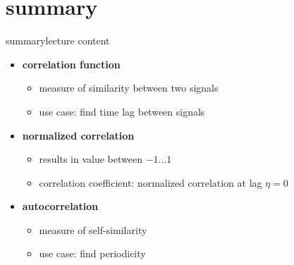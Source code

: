     \section{summary}
        \begin{frame}{summary}{lecture content}
            \begin{itemize}
                \item   \textbf{correlation function}
                    \begin{itemize}
                        \item   measure of similarity between two signals
                        \item   use case: find time lag between signals
                    \end{itemize}
                \bigskip
                \item   \textbf{normalized correlation}
                    \begin{itemize}
                        \item   results in value between $-1\ldots 1$
                        \item   correlation coefficient: normalized correlation at lag $\eta=0$
                    \end{itemize}
                \bigskip
                \item   \textbf{autocorrelation}
                    \begin{itemize}
                        \item   measure of self-similarity
                        \item   use case: find periodicity
                    \end{itemize}
            \end{itemize}
        \end{frame}

